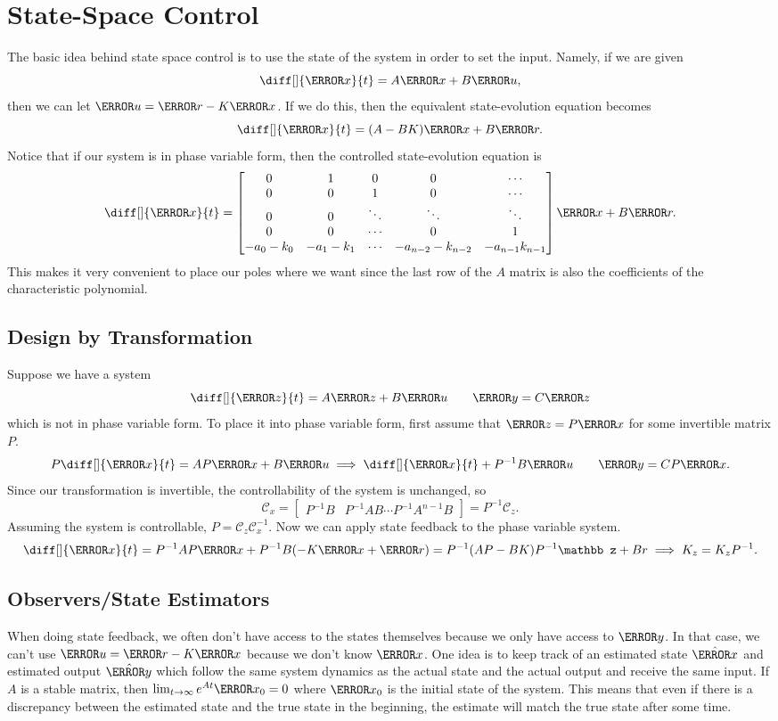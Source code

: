\section{State-Space Control} \label{sec:ss-control}
The basic idea behind state space control is to use the state of the system in order to set the input. Namely, if we are given
\[
  \diff[]{\V{x}}{t} = A\V{x}+B\V{u},
\]
then we can let $\V{u} = \V{r} - K\V{x}$.
If we do this, then the equivalent state-evolution equation becomes
\[
  \diff[]{\V{x}}{t} = (A-BK)\V{x}+B\V{r}.
\]
Notice that if our system is in phase variable form, then the controlled state-evolution equation is
\[
  \diff[]{\V{x}}{t} = \begin{bmatrix}
	0 & 1 & 0 & 0 & \cdots\\
	0 & 0 & 1 & 0 & \cdots\\
	0 & 0 & \ddots & \ddots & \ddots\\
	0 & 0 & \cdots & 0 & 1\\
	-a_0-k_0 & -a_1-k_1 & \cdots & -a_{n-2}-k_{n-2} & -a_{n-1}k_{n-1}
  \end{bmatrix}\V{x} + B\V{r}.
\]
This makes it very convenient to place our poles where we want since the last row of the $A$ matrix is also the coefficients of the characteristic polynomial.
\subsection{Design by Transformation}
Suppose we have a system
\[
  \diff[]{\V{z}}{t} = A\V{z}+B\V{u} \qquad \V{y} = C\V{z}
\]
which is not in phase variable form. To place it into phase variable form, first assume that $\V{z} = P\V{x}$ for some invertible matrix $P$.
\[
  P\diff[]{\V{x}}{t} = AP\V{x}+B\V{u} \implies \diff[]{\V{x}}{t} + P^{-1}B\V{u} \qquad \V{y} = CP\V{x}.
\]
Since our transformation is invertible, the controllability of the system is unchanged, so
\[
  \mathcal{C}_x = \begin{bmatrix} P^{-1}B & P^{-1} AB \cdots P^{-1}A^{n-1}B \end{bmatrix} = P^{-1}\mathcal{C}_z.
\]
Assuming the system is controllable, $P = \mathcal{C}_z\mathcal{C}_x^{-1}$. Now we can apply state feedback to the phase variable system.
\[
  \diff[]{\V{x}}{t} = P^{-1}AP\V{x}+P^{-1}B(-K\V{x}+\V{r}) = P^{-1}(AP-BK)P^{-1}\mathbb z + Br \implies K_z = K_zP^{-1}.
\]
\subsection{Observers/State Estimators}
When doing state feedback, we often don't have access to the states themselves because we only have access to $\V{y}$. In that case, we can't use $\V{u}=\V{r}-K\V{x}$ because we don't know $\V{x}$.
One idea is to keep track of an estimated state $\hat{\V{x}}$ and estimated output $\hat{\V{y}}$ which follow the same system dynamics as the actual state and the actual output and receive the same input.
If $A$ is a stable matrix, then $\lim_{t\to\infty}e^{At}\V{x}_0=0$ where $\V{x}_0$ is the initial state of the system. This means that even if there is a discrepancy between the estimated state and the true state in the beginning, the estimate will match the true state after some time.

